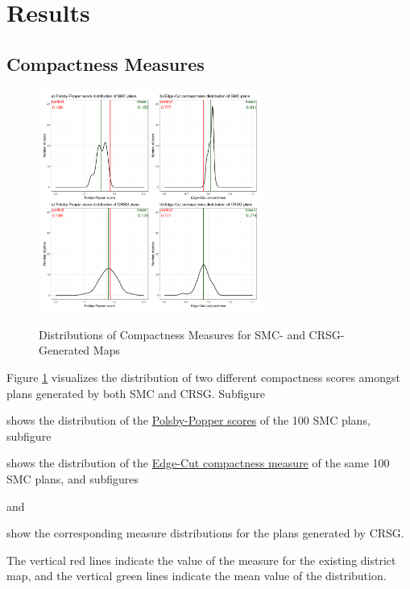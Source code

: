 \section{Results}
\label{sec:results}

\subsection{Compactness Measures}
\begin{figure}[h]
    \caption{Distributions of Compactness Measures for SMC- and CRSG-Generated Maps}
    \includegraphics[width=0.65\textwidth]{img/compact.density.png}
    \label{fig:compact.density}
    \raggedright
\end{figure}

Figure \ref{fig:compact.density} visualizes the distribution of two different compactness scores amongst plans generated by both SMC and CRSG. Subfigure
\begin{seriate} 
    \item shows the distribution of the \hyperref[sec:polsbypopper]{Polsby-Popper scores} of the 100 SMC plans, subfigure
    \item shows the distribution of the \hyperref[sec:edgecut]{Edge-Cut compactness measure} of the same 100 SMC plans, and subfigures
    \item and 
    \item show the corresponding measure distributions for the plans generated by CRSG. 
\end{seriate}
The vertical red lines indicate the value of the measure for the existing district map, and the vertical green lines indicate the mean value of the distribution. 

